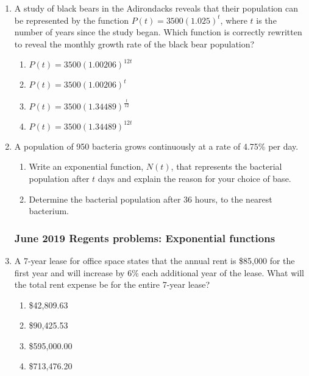 \documentclass[12pt, twoside]{article}
\begin{document}
\begin{enumerate}[itemsep=0.5cm]
\item A study of black bears in the Adirondacks reveals that their population can be represented by the function $P(t) = 3500(1.025)^t$, where $t$ is the number of years since the study began. Which function is correctly rewritten to reveal the monthly growth rate of the black bear population?
\begin{enumerate}
    \item $P(t) = 3500(1.00206)^{12t}$
    \item $P(t) = 3500(1.00206)^{t}$
    \item $P(t) = 3500(1.34489)^{\frac{t}{12}}$
    \item $P(t) = 3500(1.34489)^{12t}$
\end{enumerate}

\item A population of 950 bacteria grows continuously at a rate of 4.75\% per day.
\begin{enumerate}
    \item Write an exponential function, $N(t)$, that represents the bacterial population after $t$ days and explain the reason for your choice of base.
    \item Determine the bacterial population after 36 hours, to the nearest bacterium.
\end{enumerate}



\newpage
\subsubsection*{June 2019 Regents problems: Exponential functions}

\item A 7-year lease for office space states that the annual rent is \$85,000 for the first year and will increase by 6\% each additional year of the lease. What will the total rent expense be for the entire 7-year lease?
\begin{enumerate}
    \item \$42,809.63
    \item \$90,425.53
    \item \$595,000.00
    \item \$713,476.20
\end{enumerate}


\end{enumerate}
\end{document}
